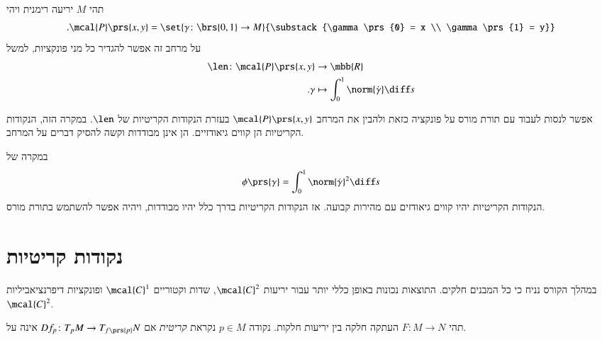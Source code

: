 \documentclass[a4paper,10pt,twoside,openany]{book}
\begin{document}
\begin{example}
תהי
$M$
יריעה רימנית ויהי
\[\text{.} \mcal{P}\prs{x,y} = \set{\gamma \colon \brs{0,1} \to M}{\substack{\gamma\prs{0} = x \\ \gamma\prs{1} = y}}\]
על מרחב זה אפשר להגדיר כל מני פונקציות, למשל
\begin{align*}
\len \colon \mcal{P}\prs{x,y} &\to \mbb{R} \\
\text{.} \gamma &\mapsto \int_0^1 \norm{\dot{\gamma}} \diff s
\end{align*}

אפשר לנסות לעבוד עם תורת מורס על פונקציה כזאת ולהבין את המרחב
$\mcal{P}\prs{x,y}$
בעזרת הנקודות הקריטיות של
$\len$.
במקרה הזה, הנקודות הקריטיות הן קווים גיאודזיים. הן אינן מבודדות וקשה להסיק דברים על המרחב.

במקרה של
\[ \phi\prs{\gamma} = \int_0^1 \norm{\dot{\gamma}}^2 \diff s\]
הנקודות הקריטיות יהיו קווים גיאודזים עם מהירות קבועה. אז הנקודות הקריטיות בדרך כלל יהיו מבודדות, ויהיה אפשר להשתמש בתורת מורס.
\end{example}

\section{נקודות קריטיות}

במהלך הקורס נניח כי כל המבנים חלקים.
התוצאות נכונות באופן כללי יותר עבור יריעות
$\mcal{C}^2$,
שדות וקטוריים
$\mcal{C}^1$
ופונקציות דיפרנציאביליות
$\mcal{C}^2$.

\begin{definition}
תהי
$F \colon M \to N$
העתקה חלקה בין יריעות חלקות.
נקודה
$p \in M$
נקראת
\emph{קריטית}
אם
$D f_p \colon T_p M \to T_{f\prs{p}} N$
אינה על.
\end{definition}
\end{document}
